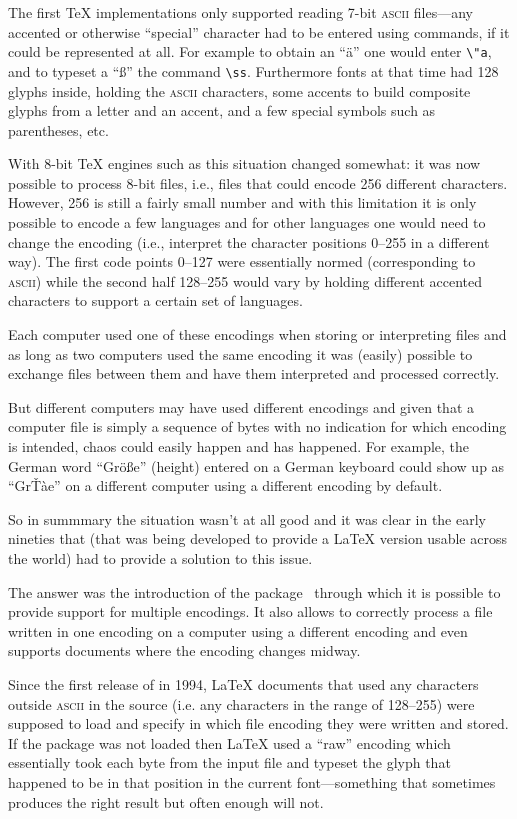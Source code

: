 \documentclass{ltnews}
\providecommand\acro[1]{\textsc{#1}}
\begin{document}
The first \TeX{} implementations only supported reading 7-bit
\acro{ascii} files---any accented or otherwise ``special'' character
had to be entered using commands, if it could be represented at
all. For example to obtain an ``\"a'' one would enter \verb=\"a=, and to
typeset a ``\ss'' the command \verb=\ss=. Furthermore fonts at that
time had 128 glyphs inside, holding the \acro{ascii} characters, some
accents to build composite glyphs from a letter and an accent, and a
few special symbols such as parentheses, etc.

With 8-bit \TeX{} engines such as  this situation changed
somewhat: it was now possible to process 8-bit files, i.e., files that
could encode 256 different characters. However, 256 is still a fairly
small number and with this limitation it is only possible to encode a
few languages and for other languages one would need to change the
encoding (i.e., interpret the character positions 0--255 in a
different way). The first code points 0--127 were essentially normed
(corresponding to \acro{ascii}) while the second half 128--255 would
vary by holding different accented characters to support a certain set
of languages.

Each computer used one of these encodings when storing or interpreting
files and as long as two computers used the same encoding it was
(easily) possible to exchange files between them and have them
interpreted and processed correctly.

But different computers may have used different encodings and given
that a computer file is simply a sequence of bytes with no indication for
which encoding is intended, chaos could easily happen and has
happened. For example, the German word ``Gr\"o\ss e'' (height) entered on a
German keyboard could show up as ``Gr\v T\`ae'' on a different
computer using a different encoding by default.

So in summmary the situation wasn't at all good and it was clear in
the early nineties that \LaTeXe{} (that was being developed to provide
a \LaTeX{} version usable across the world) had to provide a solution
to this issue.

The \LaTeXe{} answer was the introduction of the 
package~\cite{Mittelbach:Brno95} through which it is possible to
provide support for multiple encodings. It also allows to correctly
process a file written in one encoding on a computer using a different
encoding and even supports documents where the encoding changes
midway.

Since the first release of \LaTeXe{} in 1994, \LaTeX{} documents that
used any characters outside \acro{ascii} in the source (i.e. any
characters in the range of 128--255) were supposed to load
 and specify in which file encoding they were
written and stored.
%
If the  package was not loaded then \LaTeX{} used a
``raw'' encoding which essentially took each byte from the input file
and typeset the glyph that happened to be in that position in the
current font---something that sometimes produces the right result but
often enough will not.
\end{document}
